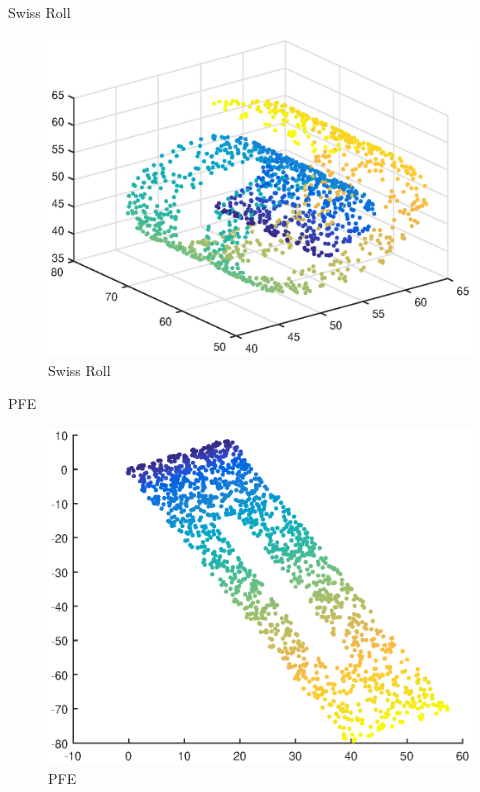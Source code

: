 \documentclass{beamer}
\begin{document}
\begin{darkframes}
   \begin{frame}{Swiss Roll}
   \begin{figure}
   \centering
   \includegraphics[scale=0.5]{./figs/swiss.eps}
   \caption{Swiss Roll}
   \end{figure}
   \end{frame}
   
   
   \begin{frame}{PFE}
   \begin{figure}
   \centering
   \includegraphics[scale=0.5]{./figs/pfe.eps}
   \caption{PFE}
   \end{figure}
   \end{frame}
   

\end{darkframes}
\end{document}
